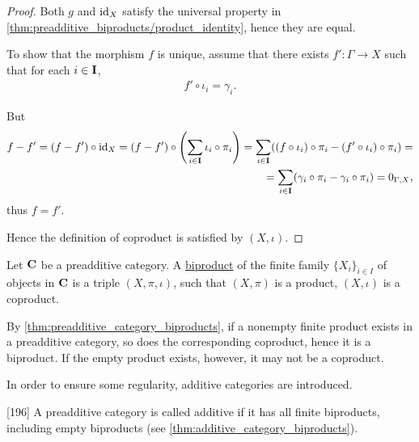 \begin{proof}
  Both $g$ and $\operatorname{id}_X$ satisfy the universal property in \cref{thm:preadditive_biproducts/product_identity}, hence they are equal.

  To show that the morphism $f$ is unique, assume that there exists $f': \Gamma \to X$ such that for each $i \in \operatorname{\mathbf{I}}$,
  \begin{align*}
    f' \circ \iota_i = \gamma_i.
  \end{align*}

  But
  \begin{align*}
    f - f'
    =
    (f - f') \circ \operatorname{id}_X
    =
    (f - f') \circ \left( \sum_{i \in \operatorname{\mathbf{I}}} \iota_i \circ \pi_i \right)
    =
    \sum_{i \in \operatorname{\mathbf{I}}} ((f \circ \iota_i) \circ \pi_i - (f' \circ \iota_i) \circ \pi_i)
    = \\ =
    \sum_{i \in \operatorname{\mathbf{I}}} (\gamma_i \circ \pi_i - \gamma_i \circ \pi_i)
    =
    0_{\Gamma,X},
  \end{align*}
  thus $f = f'$.

  Hence the definition of coproduct is satisfied by $(X, \iota)$.
\end{proof}

\begin{definition}\label{def:categorical_biproduct}
  Let $\operatorname{\mathbf{C}}$ be a preadditive category. A \ul{biproduct} of the finite family $\{ X_i \}_{i \in I}$ of objects in $\operatorname{\mathbf{C}}$ is a triple $(X, \pi, \iota)$, such that $(X, \pi)$ is a product, $(X, \iota)$ is a coproduct.
\end{definition}

\begin{note}\label{note:preadditive_category_biproducts}
  By \cref{thm:preadditive_category_biproducts}, if a nonempty finite product exists in a preadditive category, so does the corresponding coproduct, hence it is a biproduct. If the empty product exists, however, it may not be a coproduct.

  In order to ensure some regularity, additive categories are introduced.
\end{note}

\begin{definition}\label{def:additive_category}\cite{MacLane1994}[196]
  A preadditive category is called additive if it has all finite biproducts, including empty biproducts (see \cref{thm:additive_category_biproducts}).
\end{definition}

